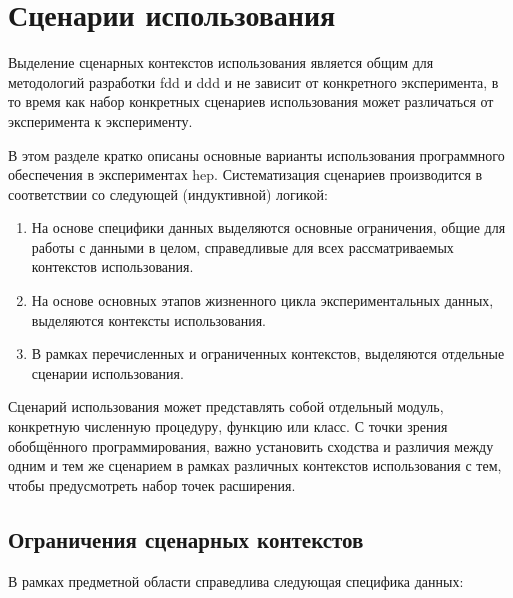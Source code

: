 \section{Сценарии использования}

Выделение сценарных контекстов использования является общим для методологий
разработки \acrshort{fdd} и \acrshort{ddd} и не зависит от конкретного
эксперимента, в то время
как набор конкретных сценариев использования может различаться от
эксперимента к эксперименту.

В этом разделе кратко описаны основные варианты использования программного
обеспечения в экспериментах \acrshort{hep}. Систематизация сценариев
производится в соответствии со следующей (индуктивной) логикой:
\begin{enumerate}
    \item На основе специфики данных выделяются основные ограничения,
    общие для работы с данными в целом, справедливые для всех
    рассматриваемых контекстов использования.
    \item На основе основных этапов жизненного цикла экспериментальных
    данных, выделяются контексты использования.
    \item В рамках перечисленных и ограниченных контекстов, выделяются
    отдельные сценарии использования.
\end{enumerate}

Сценарий использования может представлять собой отдельный модуль,
конкретную численную процедуру, функцию или класс. С точки зрения
обобщённого программирования, важно установить сходства и различия
между одним и тем же сценарием в рамках различных контекстов
использования с тем, чтобы предусмотреть набор точек расширения.

\subsection{Ограничения сценарных контекстов}

В рамках предметной области справедлива следующая специфика данных:

